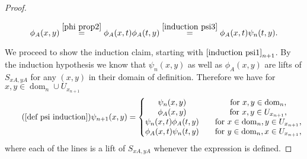 \documentclass[b5paper,draft,openbib,12pt]{memoir}
\DeclareMathOperator{\dom}{dom}
\begin{document}
\begin{proof}
\begin{enumerate}
\begin{equation}
  \phi_A(x,y)\overset{\eqref{phi prop2}}{=}\phi_A(x,t)\phi_A(t,y)\overset{\eqref{induction psi3}}{=}\phi_A(x,t)\psi_n(t,y).
  \end{equation}
  \end{enumerate}
We proceed to show the induction claim, 
starting with \(\eqref{induction psi1}_{n+1}\). By the induction 
hypothesis we know that \(\psi_n(x,y)\) as well as 
\(\phi_A(x,y)\) are lifts of \(S_{xA,yA}\) for any \((x,y)\) in their 
domain of definition. Therefore we have for \(x,y\in \dom_n \cup U_{x_{n+1}}\)
 \begin{equation}\tag{\ref{def psi induction}}
 \psi_{n+1}(x,y)=\left\{\begin{matrix}
 \psi_n(x,y) \quad &\text{for }x,y\in \dom_n,\\
 \phi_A(x,y) \quad &\text{for } x,y\in U_{x_{n+1}},\\
 \psi_n(x,t)\phi_A(t,y)\quad &\text{for } x\in \dom_n, y\in U_{x_{n+1}},\\
 \phi_A(x,t)\psi_n(t,y)\quad &\text{for } y\in \dom_n, x\in U_{x_{n+1}},
 \end{matrix} \right.
 \end{equation} 
where each of the lines is a lift of \(S_{xA,y A}\) whenever the expression is defined.



\end{proof}
\end{document}
